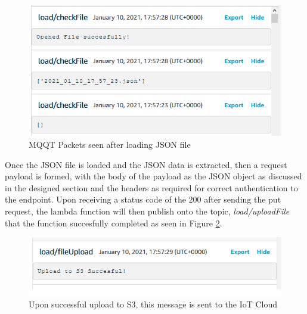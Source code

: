 \begin{figure}[ht]
    \centering
    \includegraphics[width=1\linewidth]{pages/Chapter5/Chapter 5 images/Lambda-Fns/load_checkFile.png}
    \caption{MQQT Packets seen after loading JSON file}
    \label{fig:load_checkFile}
\end{figure}

Once the JSON file is loaded and the JSON data is extracted, then a request payload is formed, with the body of the payload as the JSON object as discussed in the designed section and the headers as required for correct authentication to the endpoint. Upon receiving a status code of the 200 after sending the put request, the lambda function will then publish onto the topic, \textit{load/uploadFile} that the function succesfully completed as seen in Figure \ref{fig:load_uploadFile}. 

\begin{figure}[ht]
    \centering
    \includegraphics[width=1\linewidth]{pages/Chapter5/Chapter 5 images/Lambda-Fns/load_fileUpload.png}
    \caption{Upon successful upload to S3, this message is sent to the IoT Cloud}
    \label{fig:load_uploadFile}
\end{figure}


